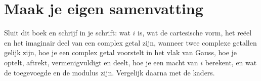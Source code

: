 \begin{oefeningen}







\end{oefeningen}


\ifzelfstudie
\section*{Maak je eigen samenvatting}
Sluit dit boek en schrijf in je schrift: wat $i$ is, wat de cartesische vorm, het reëel en het imaginair deel van een complex getal zijn, wanneer twee complexe getallen gelijk zijn, hoe je een complex getal voorstelt in het vlak van Gauss, hoe je optelt, aftrekt, vermenigvuldigt en deelt, hoe je een macht van $i$ berekent, en wat de toegevoegde en de modulus zijn. Vergelijk daarna met de kaders.
\fi
